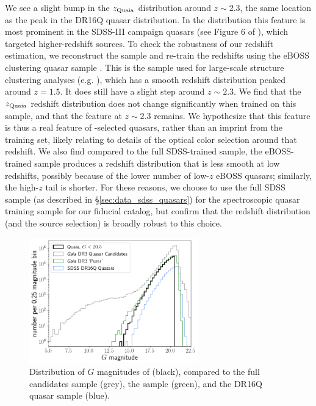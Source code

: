 We see a slight bump in the $z_\mathrm{Quaia}$ distribution around $z\sim2.3$, the same location as the peak in the \SDSS DR16Q quasar distribution.
In the \SDSS distribution this feature is most prominent in the SDSS-III campaign quasars (see Figure 6 of \citealt{lyke_sloan_2020}), which targeted higher-redshift sources.
To check the robustness of our redshift estimation, we reconstruct the sample and re-train the redshifts using the eBOSS clustering quasar sample \citep{ross_completed_2020}.
This is the sample used for large-scale structure clustering analyses (e.g. \citealt{rezaie_primordial_2021, mueller_clustering_2021}), which has a smooth redshift distribution peaked around $z=1.5$.
It does still have a slight step around $z\sim2.3$. 
We find that the $z_\mathrm{Quaia}$ redshift distribution does not change significantly when trained on this sample, and that the feature at $z\sim2.3$ remains.
We hypothesize that this feature is thus a real feature of \Gaia-selected quasars, rather than an imprint from the training set, likely relating to details of the optical color selection around that redshift.
We also find compared to the full SDSS-trained sample, the eBOSS-trained sample produces a redshift distribution that is less smooth at low redshifts, possibly because of the lower number of low-$z$ eBOSS quasars; similarly, the high-$z$ tail is shorter.
For these reasons, we choose to use the full SDSS sample (as described in \S\ref{sec:data_sdss_quasars}) for the spectroscopic quasar training sample for our fiducial \cat catalog, but confirm that the redshift distribution (and the source selection) is broadly robust to this choice.

\begin{figure}
    \centering
    \includegraphics[width=0.65\textwidth]{G_dist}
    \caption{Distribution of $G$ magnitudes of \cat (black), compared to the full \Gaia candidates sample (grey), the \Gaiapurer sample (green), and the \SDSS DR16Q quasar sample (blue).}
    \label{fig:G_dist}
\end{figure}

